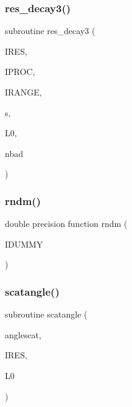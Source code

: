 \mbox{\label{sophia_8f_afdb8624294bb5ad954b4b204506af2ae}} 
\subsubsection{\texorpdfstring{res\+\_\+decay3()}{res\_decay3()}}
{\footnotesize\ttfamily subroutine res\+\_\+decay3 (\begin{DoxyParamCaption}\item[{}]{I\+R\+ES,  }\item[{}]{I\+P\+R\+OC,  }\item[{}]{I\+R\+A\+N\+GE,  }\item[{}]{s,  }\item[{}]{L0,  }\item[{}]{nbad }\end{DoxyParamCaption})}

\mbox{\label{sophia_8f_aed998ddeef674b380ab46e12a16db0bc}} 
\subsubsection{\texorpdfstring{rndm()}{rndm()}}
{\footnotesize\ttfamily double precision function rndm (\begin{DoxyParamCaption}\item[{}]{I\+D\+U\+M\+MY }\end{DoxyParamCaption})}

\mbox{\label{sophia_8f_a418495cd6ce7360591246a1ee9b038c1}} 
\subsubsection{\texorpdfstring{scatangle()}{scatangle()}}
{\footnotesize\ttfamily subroutine scatangle (\begin{DoxyParamCaption}\item[{}]{anglescat,  }\item[{}]{I\+R\+ES,  }\item[{}]{L0 }\end{DoxyParamCaption})}

